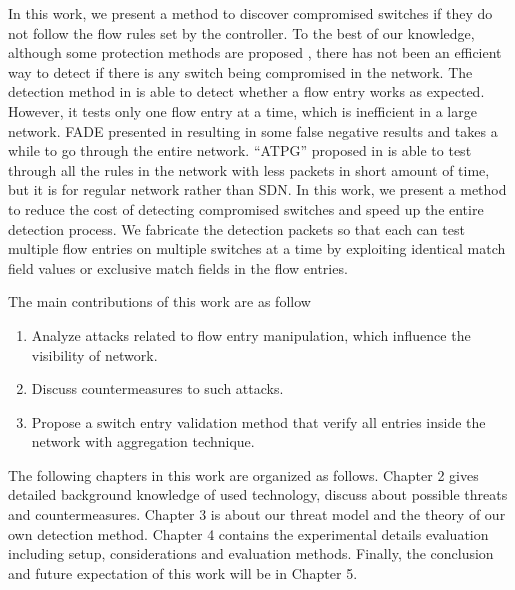 In this work, we present a method to discover compromised switches if they do not follow the flow rules set by the controller. To the best of our knowledge, although some protection methods are proposed \cite{CKGL15,PJL16}, there has not been an efficient way to detect if there is any switch being compromised in the network. The detection method in \cite{CKGL15} is able to detect whether a flow entry works as expected. However, it tests only one flow entry at a time, which is inefficient in a large network. FADE presented in \cite{PJL16} resulting in some false negative results and takes a while to go through the entire network. ``ATPG'' proposed in \cite{ZKVM12} is able to test through all the rules in the network with less packets in short amount of time, but it is for regular network rather than SDN. In this work, we present a method to reduce the cost of detecting compromised switches and speed up the entire detection process. We fabricate the detection packets so that each can test multiple flow entries on multiple switches at a time by exploiting identical match field values or exclusive match fields in the flow entries. 

The main contributions of this work are as follow 
\begin{enumerate}
\item
Analyze attacks related to flow entry manipulation, which influence the visibility of network.
\item
Discuss countermeasures to such attacks.
\item
Propose a switch entry validation method that verify all entries inside the network with aggregation technique.
\end{enumerate}

The following chapters in this work are organized as follows. Chapter 2 gives detailed background knowledge of used technology, discuss about possible threats and countermeasures. Chapter 3 is about our threat model and the theory of our own detection method. Chapter 4 contains the experimental details evaluation including setup, considerations and evaluation methods. Finally, the conclusion and future expectation of this work will be in Chapter 5.